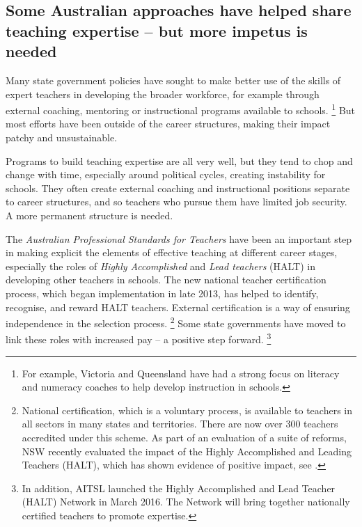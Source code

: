 \documentclass{grattan}
\begin{document}
\subsection{Some Australian approaches have helped share teaching expertise -- but more impetus is needed}\label{subsec:some-Australian-approaches--open-up-access-to-expertise---but-more-impetus-is-needed}

Many state government policies have sought to make better use of the skills of expert teachers in developing the broader workforce, for example through external coaching, mentoring or instructional programs available to schools.%
\footnote{For example, Victoria and Queensland have had a strong focus on literacy and numeracy coaches to help develop instruction in schools.} But most efforts have been outside of the career structures, making their impact patchy and unsustainable.

Programs to build teaching expertise are all very well, but they tend to chop and change with time, especially around political cycles, creating instability for schools.
They often create external coaching and instructional positions separate to career structures, and so teachers who pursue them have limited job security. A more permanent structure is needed.

The \emph{Australian Professional Standards for Teachers} have been an important step in making explicit the elements of effective teaching at different career stages, especially the roles of \emph{Highly Accomplished} and \emph{Lead teachers} (HALT) in developing other teachers in schools.
The new national teacher certification process, which began implementation in late 2013, has helped to identify, recognise, and reward HALT teachers. External certification is a way of ensuring independence in the selection process.%
\footnote{National certification, which is a voluntary process, is available to teachers in all sectors in many states and territories. There are now over 300 teachers accredited under this scheme. As part of an evaluation of a suite of reforms, NSW recently evaluated the impact of the Highly Accomplished and Leading Teachers (HALT), which has shown evidence of positive impact, see \textcite{SiMERR2015EvaluationImpactSelected}.}
Some state governments have moved to link these roles with increased pay -- a positive step forward.%
\footnote{In addition, AITSL launched the Highly Accomplished and Lead Teacher (HALT) Network in March 2016. The Network will bring together nationally certified teachers to promote expertise.}
\end{document}
